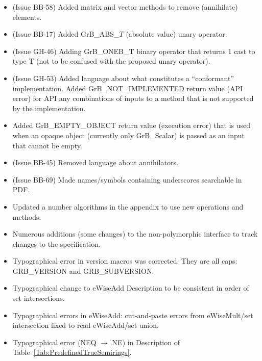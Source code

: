 \begin{itemize}
\item (Issue BB-58) Added matrix and vector methods to remove (annihilate) elements.
\item (Issue BB-17) Added {\sf GrB\_ABS\_$T$} (absolute value) unary operator.
\item (Issue GH-46) Adding {\sf GrB\_ONEB\_T} binary operator that returns 1 cast to type T (not to be confused with the proposed unary operator).
\item (Issue GH-53) Added language about what constitutes a ``conformant'' implementation.  Added {\sf GrB\_NOT\_IMPLEMENTED} return value (API error) for API any combinations of inputs to a method that is not supported by the implementation.
\item Added {\sf GrB\_EMPTY\_OBJECT} return value (execution error) that is used when an opaque object (currently only {\sf GrB\_Scalar}) is passed as an input that cannot be empty.
\item (Issue BB-45) Removed language about annihilators.
\item (Issue BB-69) Made names/symbols containing underscores searchable in PDF.
\item Updated a number algorithms in the appendix to use new operations and methods.
\item Numerous additions (some changes) to the non-polymorphic interface to track changes to the specification.
\item Typographical error in version macros was corrected.  They are all caps: {\sf GRB\_VERSION} and {\sf GRB\_SUBVERSION}.
\item Typographical change to eWiseAdd Description to be consistent in order of set intersections.
\item Typographical errors in eWiseAdd: cut-and-paste errors from eWiseMult/set intersection fixed to read eWiseAdd/set union.
\item Typographical error ({\sf NEQ} $\rightarrow$ {\sf NE}) in Description of Table~\ref{Tab:PredefinedTrueSemirings}.
\end{itemize}


